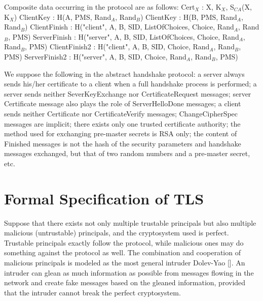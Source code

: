 \documentclass[a4paper,fleqn]{cas-dc}
\begin{document}
Composite data occurring in the protocol are as follows:
Cert$_X$ : X, K$_X$, S$_{CA}$(X, K$_X$) \newline
ClientKey : H(A, PMS, Rand$_A$, Rand$_B$) \newline
ClientKey : H(B, PMS, Rand$_A$, Rand$_B$) \newline
ClientFinish : H("client", A, B, SID, ListOfChoices, Choice, Rand$_A$, Rand$_B$, PMS)\newline
ServerFinish : H("server", A, B, SID, ListOfChoices, Choice, Rand$_A$, Rand$_B$, PMS)\newline
ClientFinish2 : H("client", A, B, SID, Choice, Rand$_A$, Rand$_B$, PMS)\newline
ServerFinish2 : H("server", A, B, SID, Choice, Rand$_A$, Rand$_B$, PMS)\newline

We suppose the following in the abstract handshake protocol: a server always sends his/her certificate to a client when a full handshake process is performed; a server sends neither SeverKeyExchange nor CertificateRequest messages; server Certificate message also plays the role of ServerHelloDone messages; a client sends neither Certificate nor CertificateVerify messages; ChangeCipherSpec messages are implicit; there exists only one trusted certificate authority; the method used for exchanging pre-master secrets is RSA only; the content of Finished messages is not the hash of the security parameters and handshake messages exchanged, but that of two random numbers and a pre-master secret, etc.

\section{Formal Specification of TLS} \label{fstls}
Suppose that there exists not only multiple trustable
principals but also multiple malicious (untrustable) principals, and the cryptosystem used is perfect. Trustable
principals exactly follow the protocol, while malicious ones may do something against the protocol as well. The combination and cooperation of malicious principals is modeled as the most general intruder Dolev-Yao [\cite{dolev}]. 
An intruder can glean as much information as possible from messages flowing in the network and create fake messages based on the gleaned information, provided that the intruder cannot break the perfect cryptosystem.
\end{document}
